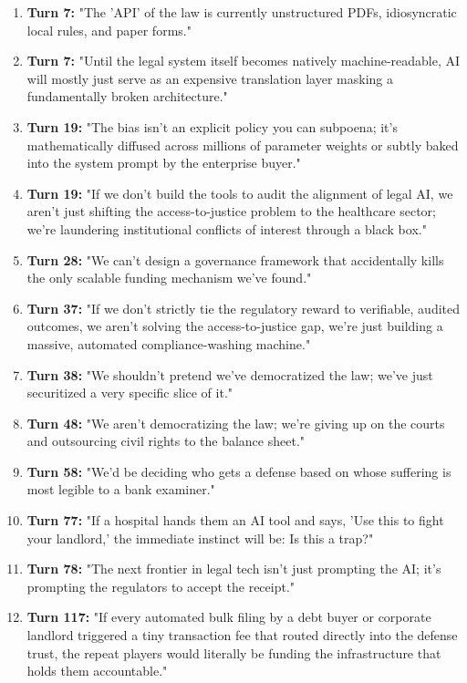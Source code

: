 \documentclass[sigconf,nonacm=true]{acmart}
\begin{document}
\begin{enumerate}[nosep]
\item \textbf{Turn 7:} "The 'API' of the law is currently unstructured PDFs, idiosyncratic local rules, and paper forms."
\item \textbf{Turn 7:} "Until the legal system itself becomes natively machine-readable, AI will mostly just serve as an expensive translation layer masking a fundamentally broken architecture."
\item \textbf{Turn 19:} "The bias isn't an explicit policy you can subpoena; it's mathematically diffused across millions of parameter weights or subtly baked into the system prompt by the enterprise buyer."
\item \textbf{Turn 19:} "If we don't build the tools to audit the alignment of legal AI, we aren't just shifting the access-to-justice problem to the healthcare sector; we're laundering institutional conflicts of interest through a black box."
\item \textbf{Turn 28:} "We can't design a governance framework that accidentally kills the only scalable funding mechanism we've found."
\item \textbf{Turn 37:} "If we don't strictly tie the regulatory reward to verifiable, audited outcomes, we aren't solving the access-to-justice gap, we're just building a massive, automated compliance-washing machine."
\item \textbf{Turn 38:} "We shouldn't pretend we've democratized the law; we've just securitized a very specific slice of it."
\item \textbf{Turn 48:} "We aren't democratizing the law; we're giving up on the courts and outsourcing civil rights to the balance sheet."
\item \textbf{Turn 58:} "We'd be deciding who gets a defense based on whose suffering is most legible to a bank examiner."
\item \textbf{Turn 77:} "If a hospital hands them an AI tool and says, 'Use this to fight your landlord,' the immediate instinct will be: Is this a trap?"
\item \textbf{Turn 78:} "The next frontier in legal tech isn't just prompting the AI; it's prompting the regulators to accept the receipt."
\item \textbf{Turn 117:} "If every automated bulk filing by a debt buyer or corporate landlord triggered a tiny transaction fee that routed directly into the defense trust, the repeat players would literally be funding the infrastructure that holds them accountable."

\end{enumerate}
\end{document}
